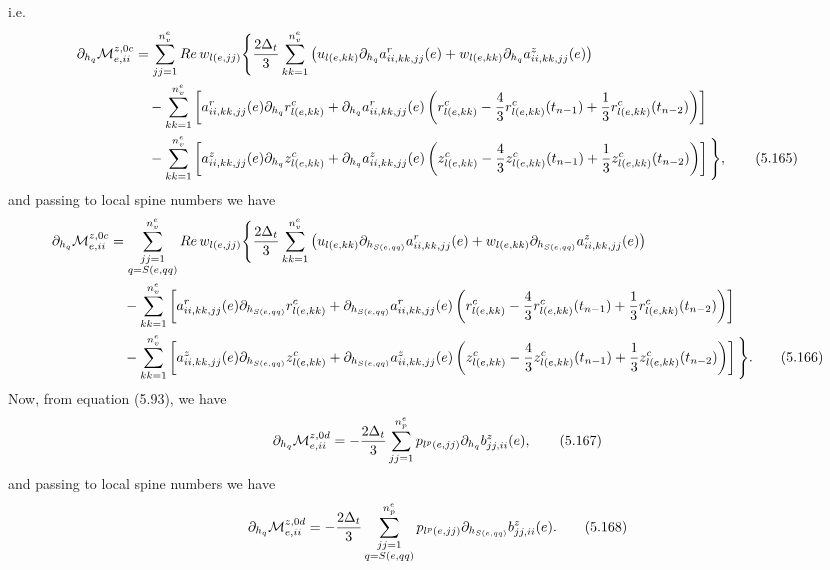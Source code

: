 \documentclass{article}
\begin{document}
i.e.
\begin{align}
\partial_{h_q}\mathcal{M}_{e,ii}^{z,0c} &= \sum_{jj=1}^{n_v^e} Re\, w_{l(e,jj)} \Bigg\{ \frac{2\Delta_t}{3} \sum_{kk=1}^{n_v^e} \left( u_{l(e,kk)} \partial_{h_q} a_{ii,kk,jj}^r(e) + w_{l(e,kk)} \partial_{h_q} a_{ii,kk,jj}^z(e) \right) \nonumber\\
&\quad - \sum_{kk=1}^{n_v^e} \left[ a_{ii,kk,jj}^r(e) \partial_{h_q} r_{l(e,kk)}^c + \partial_{h_q} a_{ii,kk,jj}^r(e) \left( r_{l(e,kk)}^c - \frac{4}{3} r_{l(e,kk)}^c(t_{n-1}) + \frac{1}{3} r_{l(e,kk)}^c(t_{n-2}) \right) \right] \nonumber\\
&\quad - \sum_{kk=1}^{n_v^e} \left[ a_{ii,kk,jj}^z(e) \partial_{h_q} z_{l(e,kk)}^c + \partial_{h_q} a_{ii,kk,jj}^z(e) \left( z_{l(e,kk)}^c - \frac{4}{3} z_{l(e,kk)}^c(t_{n-1}) + \frac{1}{3} z_{l(e,kk)}^c(t_{n-2}) \right) \right] \Bigg\}, \tag{5.165}
\end{align}
and passing to local spine numbers we have
\begin{align}
\partial_{h_q}\mathcal{M}_{e,ii}^{z,0c} &= \sum_{\substack{jj=1\\ q=S(e,qq)}}^{n_v^e} Re\, w_{l(e,jj)} \Bigg\{ \frac{2\Delta_t}{3} \sum_{kk=1}^{n_v^e} \left( u_{l(e,kk)} \partial_{h_{S(e,qq)}} a_{ii,kk,jj}^r(e) + w_{l(e,kk)} \partial_{h_{S(e,qq)}} a_{ii,kk,jj}^z(e) \right) \nonumber\\
&\quad - \sum_{kk=1}^{n_v^e} \left[ a_{ii,kk,jj}^r(e) \partial_{h_{S(e,qq)}} r_{l(e,kk)}^c + \partial_{h_{S(e,qq)}} a_{ii,kk,jj}^r(e) \left( r_{l(e,kk)}^c - \frac{4}{3} r_{l(e,kk)}^c(t_{n-1}) + \frac{1}{3} r_{l(e,kk)}^c(t_{n-2}) \right) \right] \nonumber\\
&\quad - \sum_{kk=1}^{n_v^e} \left[ a_{ii,kk,jj}^z(e) \partial_{h_{S(e,qq)}} z_{l(e,kk)}^c + \partial_{h_{S(e,qq)}} a_{ii,kk,jj}^z(e) \left( z_{l(e,kk)}^c - \frac{4}{3} z_{l(e,kk)}^c(t_{n-1}) + \frac{1}{3} z_{l(e,kk)}^c(t_{n-2}) \right) \right] \Bigg\}. \tag{5.166}
\end{align}
Now, from equation (5.93), we have
\begin{equation}
\partial_{h_q}\mathcal{M}_{e,ii}^{z,0d} = -\frac{2\Delta_t}{3} \sum_{jj=1}^{n_p^e} p_{l^p(e,jj)} \partial_{h_q} b_{jj,ii}^z(e), \tag{5.167}
\end{equation}
and passing to local spine numbers we have
\begin{equation}
\partial_{h_q}\mathcal{M}_{e,ii}^{z,0d} = -\frac{2\Delta_t}{3} \sum_{\substack{jj=1\\ q=S(e,qq)}}^{n_p^e} p_{l^p(e,jj)} \partial_{h_{S(e,qq)}} b_{jj,ii}^z(e). \tag{5.168}
\end{equation}
\end{document}
